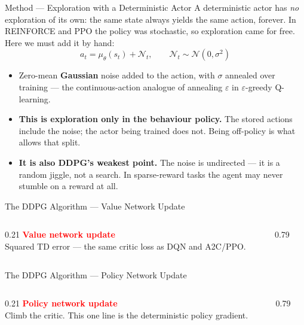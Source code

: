 \begin{frame}{Method --- Exploration with a Deterministic Actor}
\vspace{0.4em}
A deterministic actor has \emph{no} exploration of its own: the same state always yields the same action, forever. In REINFORCE and PPO the policy was stochastic, so exploration came for free. Here we must add it by hand:
\[
a_t = \mu_\theta(s_t) + \mathcal{N}_t, \qquad \mathcal{N}_t \sim \mathcal{N}(0, \sigma^2)
\]
\begin{itemize}
    \item Zero-mean \textbf{Gaussian} noise added to the action, with $\sigma$ annealed over training --- the continuous-action analogue of annealing $\varepsilon$ in $\varepsilon$-greedy Q-learning.
    \pause
    \item \textbf{This is exploration only in the behaviour policy.} The stored actions include the noise; the actor being trained does not. Being off-policy is what allows that split.
    \item \textbf{It is also DDPG's weakest point.} The noise is undirected --- it is a random jiggle, not a search. In sparse-reward tasks the agent may never stumble on a reward at all.
\end{itemize}
\end{frame}

\begin{frame}{The DDPG Algorithm --- Value Network Update}
\begin{columns}[T]
\begin{column}{0.21\textwidth}
\vspace{8.6em}
\footnotesize
\textbf{\textcolor{red}{Value network update}}\\[0.4em]
{\scriptsize Squared TD error --- the same critic loss as DQN and A2C/PPO.}
\end{column}
\begin{column}{0.79\textwidth}
\end{column}
\end{columns}
\end{frame}

\begin{frame}{The DDPG Algorithm --- Policy Network Update}
\begin{columns}[T]
\begin{column}{0.21\textwidth}
\vspace{11.5em}
\footnotesize
\textbf{\textcolor{red}{Policy network update}}\\[0.4em]
{\scriptsize Climb the critic. This one line is the deterministic policy gradient.}
\end{column}
\begin{column}{0.79\textwidth}
\end{column}
\end{columns}
\vspace{0.2em}
\ddpgalgofoot
\end{frame}

